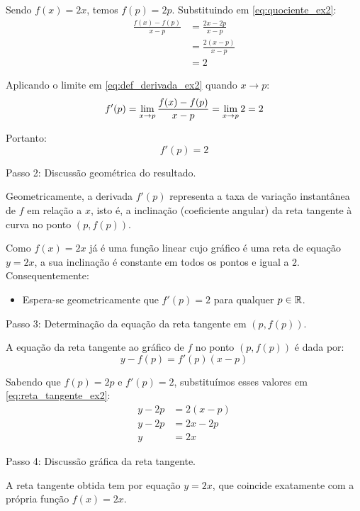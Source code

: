 Sendo $f(x) = 2x$, temos $f(p) = 2p$. Substituindo em \eqref{eq:quociente_ex2}:
\begin{align*}
    \frac{f(x) - f(p)}{x - p} &= \frac{2x - 2p}{x - p} \\[0.20cm]
    &= \frac{2(x - p)}{x - p} \\[0.20cm]
    &= 2
\end{align*}

Aplicando o limite em \eqref{eq:def_derivada_ex2} quando $x \to p$:
\[
f'(p) = \lim_{x \to p} \frac{f(x) - f(p)}{x - p} = \lim_{x \to p} 2 = 2
\]

Portanto:
\[
f'(p) = 2
\]

\vspace{0.3cm}
Passo 2: Discussão geométrica do resultado.

Geometricamente, a derivada $f'(p)$ representa a taxa de variação instantânea de $f$ em relação a $x$, isto é, a inclinação (coeficiente angular) da reta tangente à curva no ponto $(p, f(p))$.

Como $f(x) = 2x$ já é uma função linear cujo gráfico é uma reta de equação $y = 2x$, a sua inclinação é constante em todos os pontos e igual a $2$. Consequentemente:
\begin{itemize}[noitemsep, topsep=2pt]
    \item Espera-se geometricamente que $f'(p) = 2$ para qualquer $p \in \mathbb{R}$.
\end{itemize}

\vspace{0.3cm}
Passo 3: Determinação da equação da reta tangente em $(p, f(p))$.

A equação da reta tangente ao gráfico de $f$ no ponto $(p, f(p))$ é dada por:
\begin{equation}
    y - f(p) = f'(p)(x - p) \label{eq:reta_tangente_ex2}
\end{equation}

Sabendo que $f(p) = 2p$ e $f'(p) = 2$, substituímos esses valores em \eqref{eq:reta_tangente_ex2}:
\begin{align*}
    y - 2p &= 2(x - p) \\[0.20cm]
    y - 2p &= 2x - 2p \\[0.20cm]
    y &= 2x
\end{align*}

\vspace{0.3cm}
Passo 4: Discussão gráfica da reta tangente.

A reta tangente obtida tem por equação $y = 2x$, que coincide exatamente com a própria função $f(x) = 2x$.

